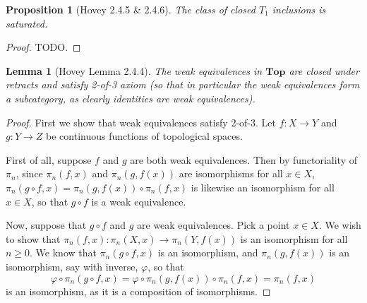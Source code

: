 \documentclass{amsart}
\theoremstyle{plain}
\newtheorem{proposition}[theorem]{Proposition}
\newtheorem{lemma}[theorem]{Lemma}
\theoremstyle{definition}
\newcommand{\Top}{\mbf{Top}}
\newcommand{\0}{\mathbf{0}}
\newcommand{\mbf}[1]{\mathbf{#1}}
\renewcommand{\(}{\left(}
\renewcommand{\)}{\right)}
\begin{document}
\begin{proposition}[Hovey 2.4.5 \& 2.4.6]\label{2.4.5-6}
  The class of closed $T_1$ inclusions is saturated.
\end{proposition}
\begin{proof}
  \color{red}TODO.
\end{proof}

\begin{lemma}[Hovey Lemma 2.4.4]\label{2.4.4}
  The weak equivalences in $\Top$ are closed under retracts and satisfy 2-of-3 axiom (so that in particular the weak equivalences form a subcategory, as clearly identities are weak equivalences).
\end{lemma}
\begin{proof}
  First we show that weak equivalences satisfy 2-of-3. Let $f:X\to Y$ and $g:Y\to Z$ be continuous functions of topological spaces. 
  
  First of all, suppose $f$ and $g$ are both weak equivalences. Then by functoriality of $\pi_n$, since $\pi_n(f,x)$ and $\pi_n(g,f(x))$ are isomorphisms for all $x\in X$, $\pi_n(g\circ f,x)=\pi_n(g,f(x))\circ\pi_n(f,x)$ is likewise an isomorphism for all $x\in X$, so that $g\circ f$ is a weak equivalence.

  Now, suppose that $g\circ f$ and $g$ are weak equivalences. Pick a point $x\in X$. We wish to show that $\pi_n(f,x):\pi_n(X,x)\to\pi_n(Y,f(x))$ is an isomorphism for all $n\geq0$. We know that $\pi_n(g\circ f,x)$ is an isomorphism, and $\pi_n(g,f(x))$ is an isomorphism, say with inverse, $\varphi$, so that
  \[\varphi\circ\pi_n(g\circ f,x)=\varphi\circ\pi_n(g,f(x))\circ\pi_n(f,x)=\pi_n(f,x)\]
  is an isomorphism, as it is a composition of isomorphisms.


\end{proof}
\end{document}
